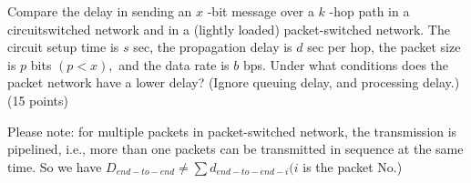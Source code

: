 \begin{exercise}[]{Compare the delay in sending an $x$ -bit message over a $k$ -hop path in a circuitswitched network and in a (lightly loaded) packet-switched network. The circuit setup time is $s$ sec, the propagation delay is $d$ sec per hop, the packet size is $p$ bits $(p<x),$ and the data rate is $b$ bps. Under what conditions does the packet network have a lower delay? (Ignore queuing delay, and processing delay.) (15 points)
    
    Please note: for multiple packets in packet-switched network, the transmission is pipelined,
    i.e., more than one packets can be transmitted in sequence at the same time. So we have $D_{e n d-t o-e n d} \neq \sum d_{e n d-t o-e n d-i}(i$ is the packet No.)}
  \begin{solution}
  \par{~}
  \end{solution}
  \label{ex6}
\end{exercise}